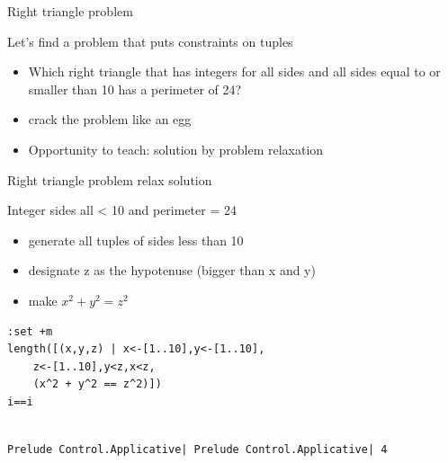 \documentclass[presetation]{beamer}
\begin{document}
\begin{frame}[label={sec:org34e7716}]{Right triangle problem}
\begin{block}{Let's find a problem that puts constraints on tuples}
\begin{itemize}
\item Which right triangle that has integers for all sides and all sides
equal to or smaller than 10 has a perimeter of 24?
\end{itemize}
\pause 
\begin{itemize}
\item crack the problem like an egg
\end{itemize}
\pause
\begin{itemize}
\item Opportunity to teach: \alert{solution by problem relaxation}
\end{itemize}
\end{block}
\end{frame}
\begin{frame}[fragile,label={sec:org485f41e}]{Right triangle problem relax solution}
 \begin{block}{Integer sides all < 10 and perimeter = 24}
\begin{itemize}
\item generate all tuples of sides less than 10
\end{itemize}
\pause
\begin{itemize}
\item designate z as the hypotenuse (bigger than x and y)
\end{itemize}
\pause
\begin{itemize}
\item make \(x^2 + y^2 = z^2\)
\end{itemize}
\begin{verbatim}
:set +m
length([(x,y,z) | x<-[1..10],y<-[1..10],
	z<-[1..10],y<z,x<z,
	(x^2 + y^2 == z^2)])
i==i
\end{verbatim}

\begin{verbatim}

Prelude Control.Applicative| Prelude Control.Applicative| 4
\end{verbatim}
\end{block}
\end{frame}
\end{document}
